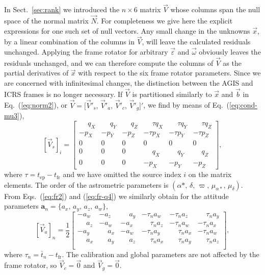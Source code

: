 \documentclass[structabstract]{aa}
\newcommand{\quat}[1]{\mathbf{#1}}
\begin{document}
In Sect.~\ref{sec:rank} we introduced the $n\times 6$ matrix $\vec{V}$
whose columns span the null space of the normal matrix $\vec{N}$.
For completeness we give here the explicit expressions for one 
such set of null vectors.
Any small change in the unknowns $\vec{x}$, by a linear combination
of the columns in $\vec{V}$, will leave the calculated residuals unchanged.
Applying the frame rotator for arbitrary $\vec{\varepsilon}$ and 
$\vec{\omega}$ obviously leaves the residuals unchanged, and we can
therefore compute the columns of $\vec{V}$ as the partial derivatives
of $\vec{x}$ with respect to the six frame rotator parameters. Since
we are concerned with infinitesimal changes, the distinction between
the AGIS and ICRS frames is no longer necessary. If $\vec{V}$ is
partitioned similarly to $\vec{x}$ and $\vec{b}$ in Eq.~(\ref{eq:norm2}),
or $\vec{V}=\big[\vec{V}'_s,\,\vec{V}'_a,\,\vec{V}'_c,\,\vec{V}'_g\big]'$,
we find by means of Eq.~(\ref{eq:cond-mu3}),
\begin{equation}
\left[\vec{V}_s\right]_i = 
\begin{bmatrix}
\phantom{-}q_X & \phantom{-}q_Y & \phantom{-}q_Z 
   & \phantom{-}\tau q_X & \phantom{-}\tau q_Y & \phantom{-}\tau q_Z \\
-p_X & -p_Y & -p_Z & -\tau p_X & -\tau p_Y & -\tau p_Z \\
0 & 0 & 0 & 0 & 0 & 0 \\
0 & 0 & 0 & \phantom{-}q_X & \phantom{-}q_Y & \phantom{-}q_Z \\
0 & 0 & 0 & -p_X & -p_Y & -p_Z 
\end{bmatrix} , 
\end{equation}
where $\tau = t_\text{ep}-t_\text{fr}$ and we have omitted the source index 
$i$ on the matrix elements. The order of the astrometric parameters is 
$(\alpha*,\,\delta,\,\varpi,\,\mu_{\alpha*},\,\mu_\delta)$. From 
Eqs.~(\ref{eq:fr2}) and (\ref{eq:fr-q4}) we similarly obtain for the attitude
parameters $\quat{a}_n=\big\{a_x,\,a_y,\,a_z,\,a_w\big\}$,
\begin{equation}
\left[\vec{V}_a\right]_n = \frac{1}{2}
\begin{bmatrix}
-a_w & -a_z & \phantom{-}a_y & -\tau_n a_w & -\tau_n a_z 
& \phantom{-}\tau_n a_y \\
\phantom{-}a_z & -a_w & -a_x & \phantom{-}\tau_n a_z & -\tau_n a_w 
& -\tau_n a_x \\
-a_y & \phantom{-}a_x & -a_w & -\tau_n a_y & \phantom{-}\tau_n a_x 
& -\tau_n a_w \\
\phantom{-}a_x & \phantom{-}a_y & \phantom{-}a_z & \phantom{-}\tau_n a_x 
& \phantom{-}\tau_n a_y & \phantom{-}\tau_n a_z \\
\end{bmatrix} , 
\end{equation}
where $\tau_n = \bar{t}_n-t_\text{fr}$. The calibration and global
parameters are not affected by the frame rotator, so $\vec{V}_c=\vec{0}$ 
and $\vec{V}_g=\vec{0}$.
\end{document}
